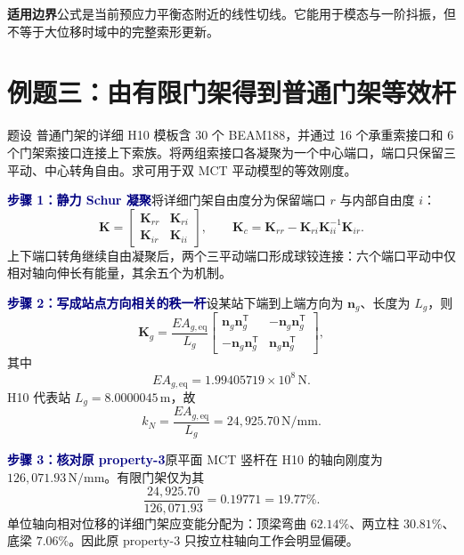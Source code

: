 \documentclass[11pt,a4paper]{article}
\newcommand{\T}{\mathsf{T}}
\newcommand{\Step}[1]{\par\medskip\noindent\textcolor{Navy}{\bfseries 步骤 #1}\quad}
\newcommand{\Scope}{\par\medskip\noindent\textcolor{Warn}{\bfseries 适用边界}\quad}
\begin{document}
\Scope 公式是当前预应力平衡态附近的线性切线。它能用于模态与一阶抖振，但不等于大位移时域中的完整索形更新。

\section{例题三：由有限门架得到普通门架等效杆}
\begin{problem}{题设}
普通门架的详细 H10 模板含 30 个 BEAM188，并通过 16 个承重索接口和 6 个门架索接口连接上下索族。将两组索接口各凝聚为一个中心端口，端口只保留三平动、中心转角自由。求可用于双 MCT 平动模型的等效刚度。
\end{problem}

\Step{1：静力 Schur 凝聚}将详细门架自由度分为保留端口 $r$ 与内部自由度 $i$：
\begin{equation}
\bm K=
\begin{bmatrix}\bm K_{rr}&\bm K_{ri}\\\bm K_{ir}&\bm K_{ii}\end{bmatrix},
\qquad
\bm K_c=\bm K_{rr}-\bm K_{ri}\bm K_{ii}^{-1}\bm K_{ir}.
\end{equation}
上下端口转角继续自由凝聚后，两个三平动端口形成球铰连接：六个端口平动中仅相对轴向伸长有能量，其余五个为机制。

\Step{2：写成站点方向相关的秩一杆}设某站下端到上端方向为 $\bm n_g$、长度为 $L_g$，则
\begin{equation}
\boxed{\bm K_g=\frac{EA_{g,\mathrm{eq}}}{L_g}
\begin{bmatrix}
\bm n_g\bm n_g^{\T}&-\bm n_g\bm n_g^{\T}\\
-\bm n_g\bm n_g^{\T}&\bm n_g\bm n_g^{\T}
\end{bmatrix}},
\end{equation}
其中
\begin{equation}
EA_{g,\mathrm{eq}}=1.99405719\times10^8\,\mathrm N.
\end{equation}
H10 代表站 $L_g=8.0000045\,\mathrm m$，故
\begin{equation}
k_N=\frac{EA_{g,\mathrm{eq}}}{L_g}=24{,}925.70\,\mathrm{N/mm}.
\end{equation}

\Step{3：核对原 property-3}原平面 MCT 竖杆在 H10 的轴向刚度为 $126{,}071.93\,\mathrm{N/mm}$。有限门架仅为其
\begin{equation}
\frac{24{,}925.70}{126{,}071.93}=0.19771=19.77\%.
\end{equation}
单位轴向相对位移的详细门架应变能分配为：顶梁弯曲 $62.14\%$、两立柱 $30.81\%$、底梁 $7.06\%$。因此原 property-3 只按立柱轴向工作会明显偏硬。
\end{document}
